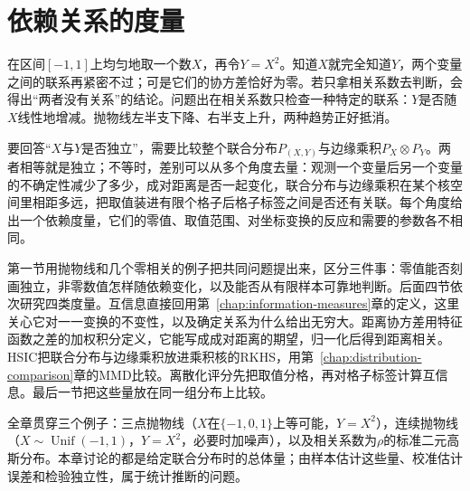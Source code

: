 \chapter{依赖关系的度量}
\label{chap:dependence-measures}

在区间$[-1,1]$上均匀地取一个数$X$，再令$Y=X^{2}$。知道$X$就完全知道$Y$，两个变量之间的联系再紧密不过；可是它们的协方差恰好为零。若只拿相关系数去判断，会得出“两者没有关系”的结论。问题出在相关系数只检查一种特定的联系：$Y$是否随$X$线性地增减。抛物线左半支下降、右半支上升，两种趋势正好抵消。

要回答“$X$与$Y$是否独立”，需要比较整个联合分布$P_{(X,Y)}$与边缘乘积$P_X\otimes P_Y$。两者相等就是独立；不等时，差别可以从多个角度去量：观测一个变量后另一个变量的不确定性减少了多少，成对距离是否一起变化，联合分布与边缘乘积在某个核空间里相距多远，把取值装进有限个格子后格子标签之间是否还有关联。每个角度给出一个依赖度量，它们的零值、取值范围、对坐标变换的反应和需要的参数各不相同。

第一节用抛物线和几个零相关的例子把共同问题提出来，区分三件事：零值能否刻画独立，非零数值怎样随依赖变化，以及能否从有限样本可靠地判断。后面四节依次研究四类度量。互信息直接回用第~\ref{chap:information-measures}章的定义，这里关心它对一一变换的不变性，以及确定关系为什么给出无穷大。距离协方差用特征函数之差的加权积分定义，它能写成成对距离的期望，归一化后得到距离相关。HSIC把联合分布与边缘乘积放进乘积核的RKHS，用第~\ref{chap:distribution-comparison}章的MMD比较。离散化评分先把取值分格，再对格子标签计算互信息。最后一节把这些量放在同一组分布上比较。

全章贯穿三个例子：三点抛物线（$X$在$\{-1,0,1\}$上等可能，$Y=X^{2}$），连续抛物线（$X\sim\operatorname{Unif}(-1,1)$，$Y=X^{2}$，必要时加噪声），以及相关系数为$\rho$的标准二元高斯分布。本章讨论的都是给定联合分布时的总体量；由样本估计这些量、校准估计误差和检验独立性，属于统计推断的问题。














